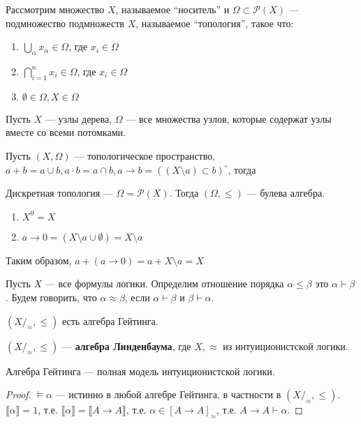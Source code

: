 \documentclass[12pt, a4paper, oneside]{book}
\begin{document}
\begin{definition}[топология]
    Рассмотрим множество \(X\), называемое ``носитель'' и \(\Omega \subset \mathcal{P}(X)\) --- подмножество подмножеств \(X\), называемое ``топология'', такое что:
    \begin{enumerate}
        \item \(\bigcup_\alpha x_\alpha \in \Omega\), где \(x_i\in\Omega\)
        \item \(\bigcap_{i = 1}^{n} x_i \in \Omega\), где \(x_i\in\Omega\)
        \item \(\emptyset\in\Omega, X\in \Omega\)
    \end{enumerate}
\end{definition}

\begin{example}
    Пусть \(X\) --- узлы дерева, \(\Omega\) --- все множества узлов, которые содержат узлы вместе со всеми потомками.
\end{example}

\begin{theorem}
    Пусть \((X,\Omega)\) --- топологическое пространство, \(a + b = a\cup b, a\cdot b = a \cap b, a \to b = ((X\setminus a)\subset b)^\circ\), тогда \? %
\end{theorem}

\begin{example}
    Дискретная топология --- \(\Omega = \mathcal{P}(X)\). Тогда \((\Omega, \leq )\) --- булева алгебра.
\end{example}

\begin{enumerate}
    \item \(X^0 = X\)
    \item \(a \to 0 = (X\setminus a \cup \emptyset) = X\setminus a\)
\end{enumerate}

Таким образом, \(a + (a \to 0) = a + X\setminus a = X\)

\begin{definition}
    Пусть \(X\) --- все формулы логики. Определим отношение порядка \(\alpha \leq \beta\) это \(\alpha \vdash \beta\). Будем говорить, что \(\alpha \approx \beta\), если \(\alpha \vdash \beta\) и \(\beta \vdash \alpha\).

    \((X /_\approx, \leq )\) есть алгебра Гейтинга.
\end{definition}

\begin{definition}
    \((X /_\approx, \leq )\) --- \textbf{алгебра Линденбаума}, где \(X, \approx\) из интуиционистской логики.
\end{definition}

\begin{theorem}
    Алгебра Гейтинга --- полная модель интуиционистской логики.
\end{theorem}
\begin{proof}
    \(\models \alpha\) --- истинно в любой алгебре Гейтинга, в частности в \((X /_\approx, \leq )\). \(\llbracket \alpha \rrbracket = 1\), т.е. \(\llbracket \alpha \rrbracket = \llbracket A \to A \rrbracket\), т.е. \(\alpha \in [A \to A]_\approx\), т.е. \(A \to A \vdash \alpha\).
\end{proof}
\end{document}
